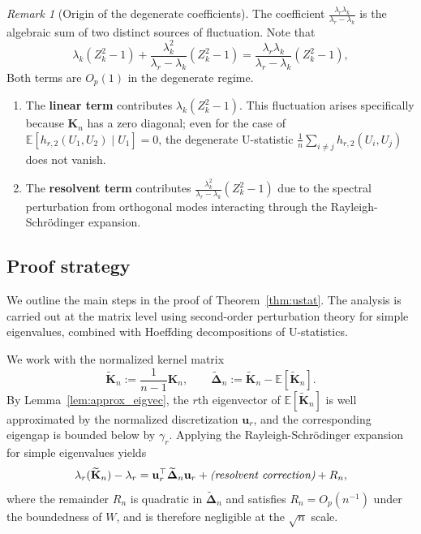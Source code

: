 \documentclass[11pt]{article}
\theoremstyle{plain}
\theoremstyle{remark}
\newtheorem{remark}[theorem]{Remark}
\begin{document}
\begin{remark}[Origin of the degenerate coefficients]
The coefficient $\frac{\lambda_r \lambda_k}{\lambda_r - \lambda_k}$ is the algebraic sum of 
two distinct sources of fluctuation.
Note that 
\[
\lambda_k(Z_k^2-1)
+
\frac{\lambda_k^2}{\lambda_r-\lambda_k}(Z_k^2-1)
=
\frac{\lambda_r\lambda_k}{\lambda_r-\lambda_k}(Z_k^2-1),
\]
Both terms are $O_p(1)$ in the degenerate regime.

\begin{enumerate}
    \item The \textbf{linear term} contributes $\lambda_k(Z_k^2-1)$.
    This fluctuation arises specifically because $\mathbf{K}_n$ has a zero diagonal; even for the case
    of $\mathbb{E}[h_{r,2}(U_1,U_2)\mid U_1]=0$, the 
    degenerate U-statistic $\frac{1}{n}\sum_{i\neq j}h_{r,2}(U_i,U_j)$ does not vanish.
    \item The \textbf{resolvent term} contributes 
    $\frac{\lambda_k^2}{\lambda_r - \lambda_k}(Z_k^2-1)$ due to the spectral perturbation 
    from orthogonal modes interacting through the Rayleigh-Schrödinger expansion.
\end{enumerate}

\end{remark}


\subsection{Proof strategy}
\label{sec:proof_strategy}

We outline the main steps in the proof of Theorem~\ref{thm:ustat}.
The analysis is carried out at the matrix level using second-order
perturbation theory for simple eigenvalues, combined with Hoeffding
decompositions of U-statistics.

We work with the normalized kernel matrix
\[
\widetilde{\mathbf K}_n := \frac{1}{n-1}\mathbf K_n,
\qquad
\widetilde{\mathbf\Delta}_n
:= \widetilde{\mathbf K}_n - \mathbb E[\widetilde{\mathbf K}_n].
\]
By Lemma~\ref{lem:approx_eigvec}, the $r$th eigenvector of
$\mathbb E[\widetilde{\mathbf K}_n]$ is well approximated by the
normalized discretization $\mathbf u_r$, and the corresponding eigengap
is bounded below by $\gamma_r$. Applying the Rayleigh-Schrödinger
expansion for simple eigenvalues yields
\begin{equation}
\lambda_r(\widetilde{\mathbf K}_n)-\lambda_r
=
\mathbf u_r^\top \widetilde{\mathbf\Delta}_n \mathbf u_r
+
\text{\emph{(resolvent correction)}}
+
R_n,
\label{eq:rs_outline}
\end{equation}
where the remainder $R_n$ is quadratic in
$\widetilde{\mathbf\Delta}_n$ and satisfies $R_n=O_p(n^{-1})$ under the
boundedness of $W$, and is therefore negligible at the $\sqrt n$ scale.
\end{document}
